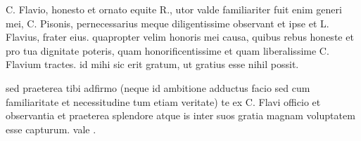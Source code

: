 


 C. Flavio, honesto et ornato equite R., utor valde familiariter fuit enim generi mei, C. Pisonis, pernecessarius meque diligentissime observant et ipse et L. Flavius, frater eius. quapropter velim honoris mei causa, quibus rebus honeste et pro tua dignitate poteris, quam honorificentissime et quam liberalissime C. Flavium tractes. id mihi sic erit gratum, ut gratius esse nihil possit.

 sed praeterea tibi adfirmo (neque id ambitione adductus facio sed cum familiaritate et necessitudine tum etiam veritate) te ex C. Flavi officio et observantia et praeterea splendore atque is inter suos gratia magnam voluptatem esse capturum. vale .
